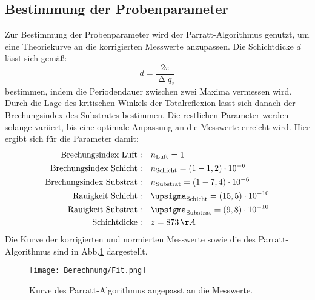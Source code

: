 \subsection{Bestimmung der Probenparameter}
Zur Bestimmung der Probenparameter wird der Parratt-Algorithmus genutzt, um eine Theoriekurve an die  korrigierten Messwerte anzupassen. Die Schichtdicke $d$ lässt sich gemäß:
\begin{equation}
d=\frac{2\pi}{\upDelta q_z}
\end{equation}
bestimmen, indem die Periodendauer zwischen zwei Maxima vermessen wird. Durch die Lage des kritischen Winkels der Totalreflexion lässt sich danach der Brechungsindex des Substrates bestimmen. Die restlichen Parameter werden solange variiert, bis eine optimale Anpassung an die Messwerte erreicht wird. Hier ergibt sich für die Parameter damit:
\begin{align}
  \text{Brechungsindex Luft}:&\quad n_\text{Luft}=1\\
  \text{Brechungsindex Schicht}:&\quad n_\text{Schicht}= \left(1-1,2\right)\cdot10^{-6}\\
  \text{Brechungsindex Substrat}:&\quad n_\text{Substrat}=\left(1-7,4\right)\cdot10^{-6}\\
  \text{Rauigkeit Schicht}:&\quad \upsigma_\text{Schicht}=\left(15,5\right)\cdot10^{-10}\\
  \text{Rauigkeit Substrat}:&\quad \upsigma_\text{Substrat}=\left(9,8\right)\cdot10^{-10}\\
  \text{Schichtdicke}:&\quad z=873\,\AA
\end{align}
Die Kurve der korrigierten und normierten Messwerte sowie die des Parratt-Algorithmus sind in Abb.\ref{fit} dargestellt.
\begin{figure}[H]
  \centering
  \texttt{[image: Berechnung/Fit.png]}
  \caption{Kurve des Parratt-Algorithmus angepasst an die Messwerte.}
  \label{fit}
\end{figure}
